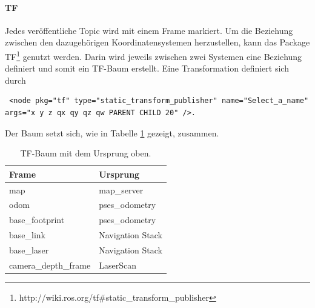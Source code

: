 \paragraph{TF}
Jedes ver\"offentliche Topic wird mit einem Frame markiert. Um die Beziehung zwischen den dazugeh\"origen Koordinatensystemen herzustellen, kann das Package TF\footnote{http://wiki.ros.org/tf\#static\_transform\_publisher} genutzt werden. Darin wird jeweils zwischen zwei Systemen eine Beziehung definiert und somit ein TF-Baum erstellt. Eine Transformation definiert sich durch
\lstset{breaklines=true, basicstyle=\small}
\begin{lstlisting}
 <node pkg="tf" type="static_transform_publisher" name="Select_a_name" args="x y z qx qy qz qw PARENT CHILD 20" />.
\end{lstlisting}
Der Baum setzt sich, wie in Tabelle \ref{tab:TF} gezeigt, zusammen.
\begin{table}[h]
	\centering
	\renewcommand{\arraystretch}{1.2}
	\begin{tabular}{ll}
		Frame & Ursprung  \\ \hline
		map & map\_server \\
		odom & pses\_odometry \\
		base\_footprint & pses\_odometry \\
		base\_link & Navigation Stack \\
		base\_laser & Navigation Stack \\
		camera\_depth\_frame & LaserScan
	\end{tabular}
	\caption{TF-Baum mit dem Ursprung oben.}
	\label{tab:TF}
\end{table}

